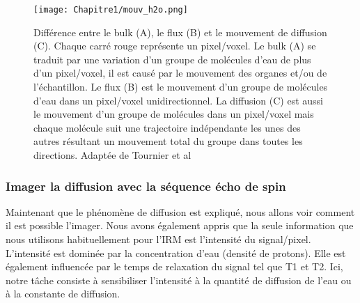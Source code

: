 \begin{figure}[!htbp]
  \begin{center}
    \texttt{[image: Chapitre1/mouv\_h2o.png]}
     \end{center}
    \caption{Différence entre le bulk (A), le flux (B) et le mouvement de diffusion (C). Chaque carré rouge représente un pixel/voxel. Le bulk (A) se traduit par une variation d’un groupe de molécules d’eau de plus d’un pixel/voxel, il est causé par le mouvement des organes et/ou de l’échantillon. Le flux (B) est le mouvement d’un groupe de molécules d’eau dans un pixel/voxel unidirectionnel. La diffusion (C) est aussi le mouvement d’un groupe de molécules dans un pixel/voxel mais chaque molécule suit une trajectoire indépendante les unes des autres résultant un mouvement total du groupe dans toutes les directions. Adaptée de Tournier et al \cite{2014}}
  \label{fig:mouv_h2o}
\end{figure}

\subsubsection{Imager la diffusion avec la séquence écho de spin}

Maintenant que le phénomène de diffusion est expliqué, nous allons voir comment il est possible l’imager. Nous avons également appris que la seule information que nous utilisons habituellement pour l'IRM est l'intensité du signal/pixel. L'intensité est dominée par la concentration d'eau (densité de protons). Elle est également influencée par le temps de relaxation du signal tel que T1 et T2. Ici, notre tâche consiste à sensibiliser l'intensité à la quantité de diffusion de l'eau ou à la constante de diffusion.

